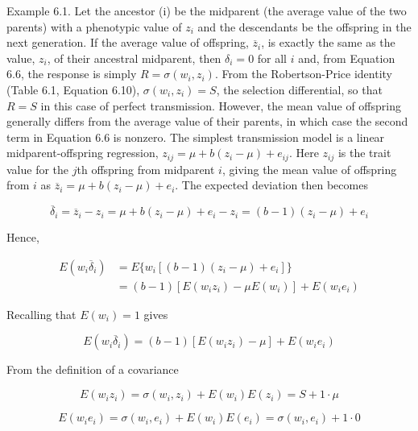 \documentclass{article}
\begin{document}
Example 6.1. Let the ancestor (i) be the midparent (the average value of the two parents) with a phenotypic value of  $ z_i $ and the descendants be the offspring in the next generation. If the average value of offspring,  $ \overline{z}_i $, is exactly the same as the value,  $ z_i $, of their ancestral midparent, then  $ \delta_i = 0 $ for all  $ i $ and, from Equation 6.6, the response is simply  $ R = \sigma(w_i, z_i) $. From the Robertson-Price identity (Table 6.1, Equation 6.10),  $ \sigma(w_i, z_i) = S $, the selection differential, so that  $ R = S $ in this case of perfect transmission. However, the mean value of offspring generally differs from the average value of their parents, in which case the second term in Equation 6.6 is nonzero. The simplest transmission model is a linear midparent-offspring regression,  $ z_{ij} = \mu + b(z_i - \mu) + e_{ij} $. Here  $ z_{ij} $ is the trait value for the  $ j $th offspring from midparent  $ i $, giving the mean value of offspring from  $ i $ as  $ \overline{z}_i = \mu + b(z_i - \mu) + e_i $. The expected deviation then becomes

\begin{equation}
\overline{\delta}_{i}=\overline{z}_{i}-z_{i}=\mu+b(z_{i}-\mu)+e_{i}-z_{i}=(b-1)(z_{i}-\mu)+e_{i}
\tag{6.9a}
\label{eq:6_9a}
\end{equation}

Hence,

\begin{equation}
\begin{aligned}E(w_{i}\overline{\delta}_{i})&=E\{w_{i}\left[(b-1)(z_{i}-\mu)+e_{i}\right]\}\\&=(b-1)[E(w_{i}z_{i})-\mu E(w_{i})]+E(w_{i}e_{i})\end{aligned}
\end{equation}

Recalling that  $  E(w_i) = 1  $ gives

\begin{equation}
E(w_{i}\overline{\delta}_{i})=(b-1)\left[E(w_{i}z_{i})-\mu\right]+E(w_{i}e_{i})
\end{equation}

From the definition of a covariance

\begin{equation}
E(w_{i}z_{i})=\sigma(w_{i},z_{i})+E(w_{i})E(z_{i})=S+1\cdot\mu
\end{equation}

\begin{equation}
E(w_{i}e_{i})=\sigma(w_{i},e_{i})+E(w_{i})E(e_{i})=\sigma(w_{i},e_{i})+1\cdot0
\end{equation}
\end{document}
